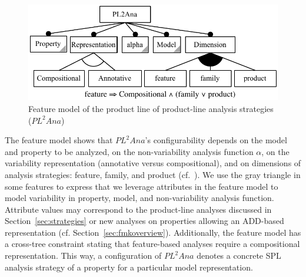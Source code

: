 \begin{figure}[t]
	\centering
	\includegraphics[width = 0.7\linewidth]{figures/fm.pdf}
	\caption{Feature model of the product line of product-line analysis strategies ($PL^{2}Ana$)}
	\label{fig:fm}
\end{figure}

The feature model shows that $PL^{2}Ana$'s configurability depends on the model and property to be analyzed, on the non-variability analysis function $\alpha$,
on the variability representation (annotative versus compositional), and on dimensions of analysis strategies: feature, family, and product (cf.~\cite{Thum2014}). 
We use the gray triangle in some features to express that we leverage attributes in the feature model to model variability in  property, model, and non-variability analysis function. Attribute values may correspond to the product-line analyses discussed in Section~\ref{sec:strategies} or new analyses on properties allowing an ADD-based representation (cf. Section~\ref{sec:fmkoverview}).  Additionally, the feature model has a cross-tree constraint stating that feature-based analyses require a compositional representation. This way, a configuration of $PL^{2}Ana$ denotes a concrete SPL analysis strategy of a property for a particular model representation.

